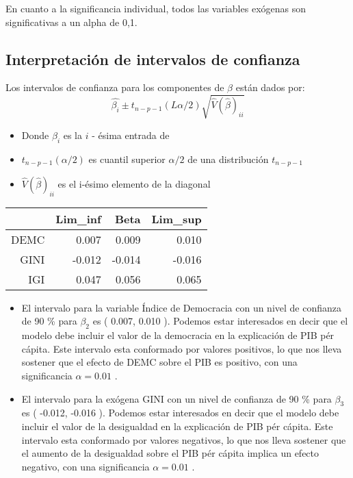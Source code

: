 \documentclass[11pt]{article}
\begin{document}
{En cuanto a la significancia individual, todos las variables exógenas son significativas a un alpha de 0,1.


\subsection{Interpretación de intervalos de confianza}

Los intervalos de confianza para los componentes de $\beta$ están dados por:
$$ \hat{\beta_i} \pm t_{n-p-1} (L\alpha/2) \sqrt{\hat{V} (\hat{\beta})_{ii}}$$
\begin{itemize}
    \item Donde $\hat{\beta_i}$ es la $i$ - ésima entrada de \hat{\beta}
    \item $t _{ n - p-1} (\alpha / 2) $ es cuantil superior $\alpha / 2$ de una distribución $t _{ n - p-1}$
    \item $\hat{V} (\hat{\beta})_{ii}$ es el i-ésimo elemento de la diagonal
\end{itemize}

\begin{table}[ht]
\centering
\begin{tabular}{rrrr}
  \hline
 & Lim\_inf & Beta & Lim\_sup \\ 
  \hline
DEMC & 0.007 & 0.009 & 0.010 \\ 
  GINI & -0.012 & -0.014 & -0.016 \\ 
  IGI & 0.047 & 0.056 & 0.065 \\ 
   \hline
\end{tabular}
\end{table}

\begin{itemize}
    \item   El intervalo para la variable Índice de Democracia con un nivel de confianza de 90 \% para $\beta_2$ es ( 0.007, 0.010 ). Podemos estar interesados en decir que el modelo debe incluir el valor de la democracia en la explicación de PIB pér cápita. Este intervalo esta conformado por valores positivos, lo que nos lleva sostener que el efecto de DEMC sobre el PIB es positivo, con una significancia  $\alpha =0.01$ .

    \item   El intervalo para la exógena GINI con un nivel de confianza de 90 \% para $\beta_3$ es ( -0.012, -0.016 ). Podemos estar interesados en decir que el modelo debe incluir el valor de la desigualdad en la explicación de PIB pér cápita. Este intervalo esta conformado por valores negativos, lo que nos lleva sostener que el aumento de la desigualdad sobre el PIB pér cápita implica un efecto negativo, con una significancia  $\alpha =0.01$ .


\end{itemize}}
\end{document}
